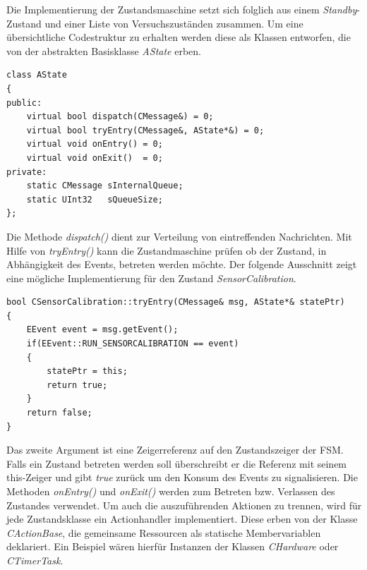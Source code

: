 Die Implementierung der Zustandsmaschine setzt sich folglich aus einem \textit{Standby}-Zustand und einer Liste von Versuchszuständen zusammen. Um eine übersichtliche Codestruktur zu erhalten werden diese als Klassen entworfen, die von der abstrakten Basisklasse \textit{AState} erben.
\begin{lstlisting}[caption={Angepasste Implementierung der abstrakten Zustandsklasse},captionpos=b]
class AState
{
public:
	virtual bool dispatch(CMessage&) = 0;
	virtual bool tryEntry(CMessage&, AState*&) = 0;
	virtual void onEntry() = 0;
	virtual void onExit()  = 0;
private:
	static CMessage sInternalQueue;
	static UInt32   sQueueSize;
};
\end{lstlisting}
Die Methode \textit{dispatch()} dient zur Verteilung von eintreffenden Nachrichten. Mit Hilfe von \textit{tryEntry()} kann die Zustandmaschine prüfen ob der Zustand, in Abhängigkeit des Events, betreten werden möchte. Der folgende Ausschnitt zeigt eine mögliche Implementierung für den Zustand \textit{SensorCalibration}.
\begin{lstlisting}[caption={Beispielhafte Definition der Methode \textit{tryEntry()}},captionpos=b]
bool CSensorCalibration::tryEntry(CMessage& msg, AState*& statePtr)
{
	EEvent event = msg.getEvent();
	if(EEvent::RUN_SENSORCALIBRATION == event)
	{
		statePtr = this;
		return true;
	}
	return false;
}
\end{lstlisting}
Das zweite Argument ist eine Zeigerreferenz auf den Zustandszeiger der FSM. Falls ein Zustand betreten werden soll überschreibt er die Referenz mit seinem this-Zeiger und gibt \textit{true} zurück um den Konsum des Events zu signalisieren. Die Methoden \textit{onEntry()} und \textit{onExit()} werden zum Betreten bzw. Verlassen des Zustandes verwendet. Um auch die auszuführenden Aktionen zu trennen, wird für jede Zustandsklasse ein Actionhandler implementiert. Diese erben von der Klasse \textit{CActionBase}, die gemeinsame Ressourcen als statische Membervariablen deklariert. Ein Beispiel wären hierfür Instanzen der Klassen \textit{CHardware} oder \textit{CTimerTask}.

